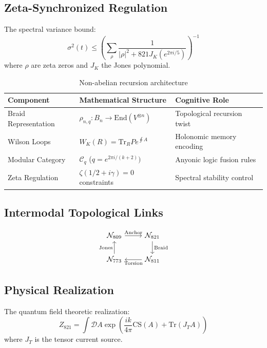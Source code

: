 \documentclass[12pt]{article}
\begin{document}
\subsection{Zeta-Synchronized Regulation}

The spectral variance bound:
\begin{equation}
\sigma^2(t) \leq \left( \sum_\rho \frac{1}{|\rho|^2 + 821 J_K(e^{2\pi i/5})} \right)^{-1}
\end{equation}
where $\rho$ are zeta zeros and $J_K$ the Jones polynomial.

\begin{table}[h]
\centering
\begin{tabular}{lll}
\toprule
Component & Mathematical Structure & Cognitive Role \\
\midrule
Braid Representation & $\rho_{n,q}: B_n \to \text{End}(V^{\otimes n})$ & Topological recursion twist \\
Wilson Loops & $W_K(R) = \text{Tr}_R P e^{\oint A}$ & Holonomic memory encoding \\
Modular Category & $\mathcal{C}_q$ ($q=e^{2\pi i/(k+2)})$ & Anyonic logic fusion rules \\
Zeta Regulation & $\zeta(1/2 + i\gamma) = 0$ constraints & Spectral stability control \\
\bottomrule
\end{tabular}
\caption{Non-abelian recursion architecture}
\end{table}

\subsection{Intermodal Topological Links}

\begin{equation}
\begin{tikzcd}
\mathcal{N}_{809} \arrow[r, "\text{Anchor}"] & \mathcal{N}_{821} \arrow[d, "\text{Braid}"] \\
\mathcal{N}_{773} \arrow[u, "\text{Jones}"] & \mathcal{N}_{811} \arrow[l, "\text{Torsion}"]
\end{tikzcd}
\end{equation}

\subsection{Physical Realization}

The quantum field theoretic realization:
\begin{equation}
Z_{821} = \int \mathcal{D}A \exp\left( \frac{ik}{4\pi} \text{CS}(A) + \text{Tr}(J_T A) \right)
\end{equation}
where $J_T$ is the tensor current source.
\end{document}

